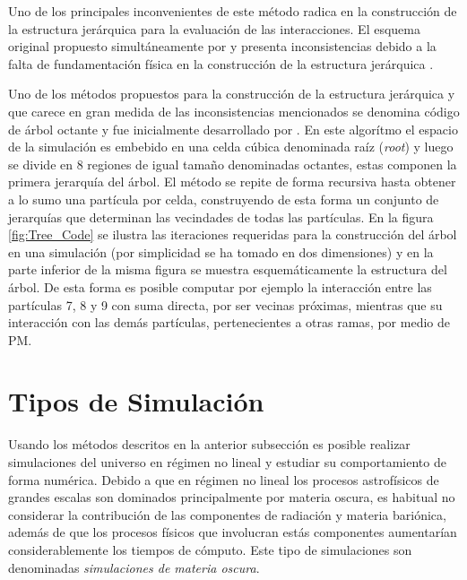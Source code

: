 Uno de los principales inconvenientes de este método radica en la 
construcción de la estructura jerárquica para la evaluación de las 
interacciones. El esquema original propuesto simultáneamente por 
\cite{appel1985} \cite{jernigan1985} y \cite{porter1985} presenta
inconsistencias debido a la falta de fundamentación física en la 
construcción de la estructura jerárquica \cite{pfalzner1996}.


Uno de los métodos propuestos para la construcción de la estructura 
jerárquica y que carece en gran medida de las inconsistencias mencionados 
se denomina código de árbol octante y fue inicialmente desarrollado por 
\cite{barnes1986}. En este algorítmo el espacio de la simulación es 
embebido en una celda cúbica denominada raíz (\textit{root}) y luego se 
divide en 8 regiones de igual tamaño denominadas octantes, estas componen 
la primera jerarquía del árbol. El método se repite de forma recursiva 
hasta obtener a lo sumo una partícula por celda, construyendo de esta 
forma un conjunto de jerarquías que determinan las vecindades de todas las 
partículas. En la figura \ref{fig:Tree_Code} se ilustra las iteraciones 
requeridas para la construcción del árbol en una simulación (por 
simplicidad se ha tomado en dos dimensiones) y en la parte inferior de la 
misma figura se muestra esquemáticamente la estructura del árbol. De esta 
forma es posible computar por ejemplo la interacción entre las partículas 
7, 8 y 9 con suma directa, por ser vecinas próximas, mientras que su 
interacción con las demás partículas, pertenecientes a otras ramas, por 
medio de PM.






\section{Tipos de Simulación}
\label{sec:Types of Simulations}


Usando los métodos descritos en la anterior subsección es posible realizar
simulaciones del universo en régimen no lineal y estudiar su comportamiento 
de forma numérica. Debido a que en régimen no lineal los procesos 
astrofísicos de grandes escalas son dominados principalmente por materia 
oscura, es habitual no consi\-derar la contribución de las componentes de 
radiación y materia bariónica, además de que los procesos físicos que 
involucran estás componentes aumentarían conside\-rablemente los tiempos 
de cómputo. Este tipo de simulaciones son denominadas \textit{simulaciones 
de materia oscura}.



